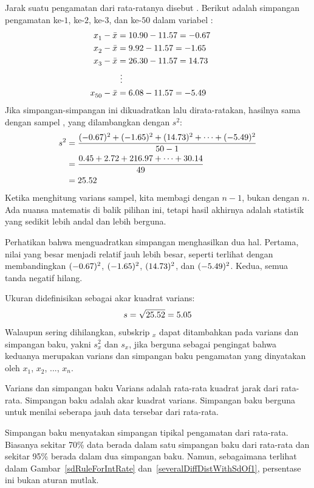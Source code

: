 Jarak suatu pengamatan dari rata-ratanya disebut
. Berikut adalah simpangan pengamatan ke-$1$,
ke-$2$, ke-$3$, dan ke-$50$ dalam variabel
:
\begin{align*}
x_1^{}-\bar{x} &= 10.90 - 11.57{} = -0.67 \hspace{5mm}\text{ } \\
x_2^{}-\bar{x} &= 9.92 - 11.57{} = -1.65 \\
x_3^{}-\bar{x} &= 26.30 - 11.57{} = 14.73 \\
			&\ \vdots \\
x_{50}^{}-\bar{x} &= 6.08 - 11.57{} = -5.49
\end{align*}
Jika simpangan-simpangan ini dikuadratkan lalu dirata-ratakan,
hasilnya sama dengan  sampel
\label{varianceIsDefined}, yang dilambangkan dengan $s_{}^2$:
\begin{align*}
s_{}^2 &= \frac{(-0.67)_{}^2 + (-1.65)_{}^2 + (14.73)_{}^2 + \cdots + (-5.49)_{}^2}{50{}-1} \\
	&= \frac{0.45 + 2.72 + 216.97 + \cdots + 30.14}{49} \\
	&= 25.52{}
\end{align*}
Ketika menghitung varians sampel, kita membagi dengan $n - 1$,
bukan dengan $n$. Ada nuansa matematis di balik pilihan ini,
tetapi hasil akhirnya adalah statistik yang sedikit lebih andal
dan lebih berguna.

Perhatikan bahwa menguadratkan simpangan menghasilkan dua hal.
Pertama, nilai yang besar menjadi relatif jauh lebih besar,
seperti terlihat dengan membandingkan $(-0.67)^2$,
$(-1.65)^2$, $(14.73)^2$, dan $(-5.49)^2$.
Kedua, semua tanda negatif hilang.

Ukuran  didefinisikan sebagai akar kuadrat varians:
\begin{align*}
s = \sqrt{25.52{}} = 5.05{}
\end{align*}
Walaupun sering dihilangkan, subskrip $_x$ dapat ditambahkan pada
varians dan simpangan baku, yakni $s_x^2$ dan $s_x^{}$, jika
berguna sebagai pengingat bahwa keduanya merupakan varians dan
simpangan baku pengamatan yang dinyatakan oleh $x_1^{}$,
$x_2^{}$, ..., $x_n^{}$.

\begin{onebox}{Varians dan simpangan baku}
  Varians adalah rata-rata kuadrat jarak dari rata-rata.
  Simpangan baku adalah akar kuadrat varians.
  Simpangan baku berguna untuk menilai seberapa jauh data tersebar
  dari rata-rata.\vspace{3mm}

  Simpangan baku menyatakan simpangan tipikal pengamatan dari
  rata-rata. Biasanya sekitar 70\% data berada dalam satu simpangan
  baku dari rata-rata dan sekitar 95\% berada dalam dua simpangan
  baku. Namun, sebagaimana terlihat dalam
  Gambar~\ref{sdRuleForIntRate} dan~\ref{severalDiffDistWithSdOf1},
  persentase ini bukan aturan mutlak.
\end{onebox}

